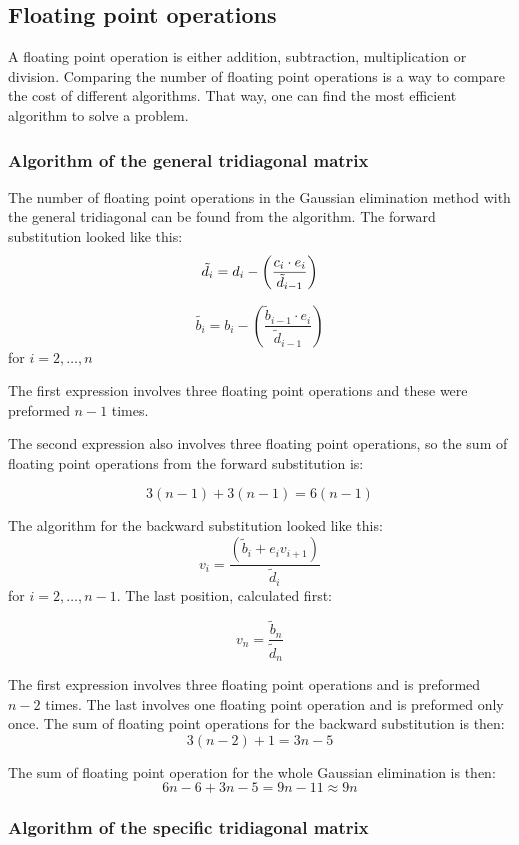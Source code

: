 \subsection{Floating point operations}

A floating point operation is either addition, subtraction, multiplication or division. Comparing the number of floating point operations is a way to compare the cost of different algorithms. That way, one can find the most efficient algorithm to solve a problem.

\subsubsection{Algorithm of the general tridiagonal matrix}

The number of floating point operations in the Gaussian elimination method with the general tridiagonal can be found from the algorithm. The forward substitution looked like this:
\[
\tilde{d_i} =  d_i - \left(\frac{c_i \cdot e_i}{\tilde{d}_{i-1}}\right)\linebreak
\]

\[
\tilde{b_i} =  b_i - \left(\frac{\tilde{b}_{i-1} \cdot e_i}{\tilde{d}_{i-1}}\right)
\]
for $i = 2, \dots, n $

The first expression involves three floating point operations and these were preformed $n-1$ times.

The second expression also involves three floating point operations, so the sum of floating point operations from the forward substitution is:

\[
3(n-1)+3(n-1) = 6(n-1)
\]

The algorithm for the backward substitution looked like this:
\[
v_i = \frac{\left(\tilde{b}_i + e_i v_{i+1}\right)}{\tilde{d}_i}
\]
for $i = 2, \dots, n-1 $. The last position, calculated first:

\[
v_{n} = \frac{\tilde{b}_{n}}{\tilde{d}_{n}}
\]

The first expression involves three floating point operations and is preformed $n-2$ times. The last involves one floating point operation and is preformed only once. The sum of floating point operations for the backward substitution is then:
\[
3(n-2) + 1 = 3n - 5
\]

The sum of floating point operation for the whole Gaussian elimination is then:
\[
6n - 6 + 3n - 5 = 9n - 11 \approx 9n
\]

\subsubsection{Algorithm of the specific tridiagonal matrix}


